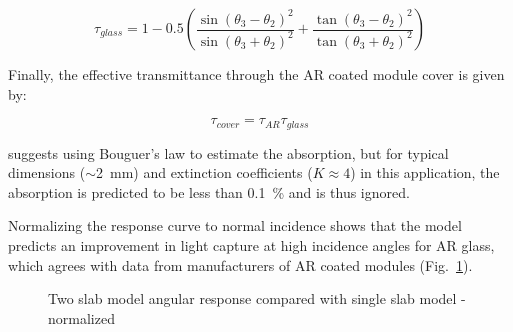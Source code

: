 \documentclass[12pt,letterpaper]{article}
\begin{document}
\begin{equation}\label{fresnel1}
\tau_{glass} = 1 - 0.5
        \left( \frac{\sin(\theta_3-\theta_2)^2}{\sin(\theta_3+\theta_2)^2} 
               + \frac{\tan(\theta_3-\theta_2)^2}{\tan(\theta_3+\theta_2)^2}  \right)
\end{equation}

Finally, the effective transmittance through the AR coated module cover is given by:

\begin{equation}\label{tau_eff}
\tau_{cover} = \tau_{AR}\tau_{glass}
\end{equation}

\cite{desoto2004a} suggests using Bouguer's law to estimate the absorption, but for typical dimensions ($\sim$2~mm) and extinction coefficients ($K\approx 4$) in this application, the absorption is predicted to be less than 0.1~\% and is thus ignored.

Normalizing the response curve to normal incidence shows that the model predicts an improvement in light capture at high incidence angles for AR glass, which agrees with data from manufacturers of AR coated modules (Fig.~\ref{fig_twoslab_norm}).

\begin{figure}[h!]
\begin{center}
\end{center}
\caption{Two slab model angular response compared with single slab model - normalized}
\label{fig_twoslab_norm}
\end{figure}
\end{document}
